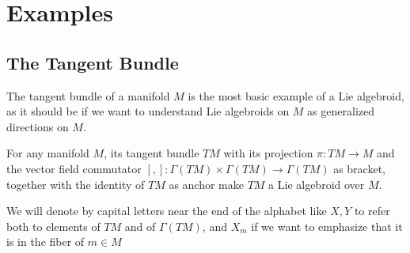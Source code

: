 \begin{definition}

\end{definition}

\begin{definition}

\end{definition}

\begin{definition}[Pullbacks]

\end{definition}

\begin{definition}[Quotients]

\end{definition}

\section{Examples}

\subsection{The Tangent Bundle}

The tangent bundle of a manifold $M$ is the most basic example of a Lie algebroid, as it should be if we want to understand Lie algebroids on $M$ as generalized directions on $M$.

For any manifold $M$, its tangent bundle $TM$ with its projection $\pi:TM \to M$ and the vector field commutator $[,]: \Gamma(TM)\times \Gamma(TM) \to \Gamma(TM)$ as bracket, together with the identity of $TM$ as anchor make $TM$ a Lie algebroid over $M$.

We will denote by capital letters near the end of the alphabet like $X, Y$ to refer both to elements of $TM$ and of $\Gamma(TM)$, and $X_m$ if we want to emphasize that it is in the fiber of $m \in M$

